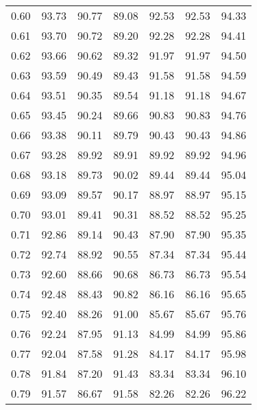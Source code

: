 \begin{tabular}{|c|c|c|c|c|c|c|}
      0.60 &     93.73 &     90.77 &      89.08 &   92.53 &      92.53 &         94.33 \\
      0.61 &     93.70 &     90.72 &      89.20 &   92.28 &      92.28 &         94.41 \\
      0.62 &     93.66 &     90.62 &      89.32 &   91.97 &      91.97 &         94.50 \\
      0.63 &     93.59 &     90.49 &      89.43 &   91.58 &      91.58 &         94.59 \\
      0.64 &     93.51 &     90.35 &      89.54 &   91.18 &      91.18 &         94.67 \\
      0.65 &     93.45 &     90.24 &      89.66 &   90.83 &      90.83 &         94.76 \\
      0.66 &     93.38 &     90.11 &      89.79 &   90.43 &      90.43 &         94.86 \\
      0.67 &     93.28 &     89.92 &      89.91 &   89.92 &      89.92 &         94.96 \\
      0.68 &     93.18 &     89.73 &      90.02 &   89.44 &      89.44 &         95.04 \\
      0.69 &     93.09 &     89.57 &      90.17 &   88.97 &      88.97 &         95.15 \\
      0.70 &     93.01 &     89.41 &      90.31 &   88.52 &      88.52 &         95.25 \\
      0.71 &     92.86 &     89.14 &      90.43 &   87.90 &      87.90 &         95.35 \\
      0.72 &     92.74 &     88.92 &      90.55 &   87.34 &      87.34 &         95.44 \\
      0.73 &     92.60 &     88.66 &      90.68 &   86.73 &      86.73 &         95.54 \\
      0.74 &     92.48 &     88.43 &      90.82 &   86.16 &      86.16 &         95.65 \\
      0.75 &     92.40 &     88.26 &      91.00 &   85.67 &      85.67 &         95.76 \\
      0.76 &     92.24 &     87.95 &      91.13 &   84.99 &      84.99 &         95.86 \\
      0.77 &     92.04 &     87.58 &      91.28 &   84.17 &      84.17 &         95.98 \\
      0.78 &     91.84 &     87.20 &      91.43 &   83.34 &      83.34 &         96.10 \\
      0.79 &     91.57 &     86.67 &      91.58 &   82.26 &      82.26 &         96.22 \\

\end{tabular}
